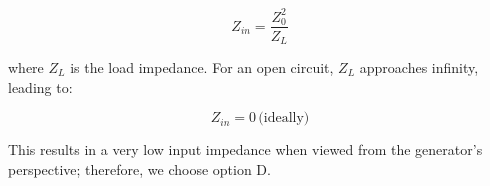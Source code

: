    \[
   Z_{in} = \frac{Z_0^2}{Z_L}
   \]

   where \(Z_L\) is the load impedance. For an open circuit, \(Z_L\) approaches infinity, leading to:

   \[
   Z_{in} = 0 \, \text{(ideally)}
   \]

This results in a very low input impedance when viewed from the generator's perspective; therefore, we choose option D.




